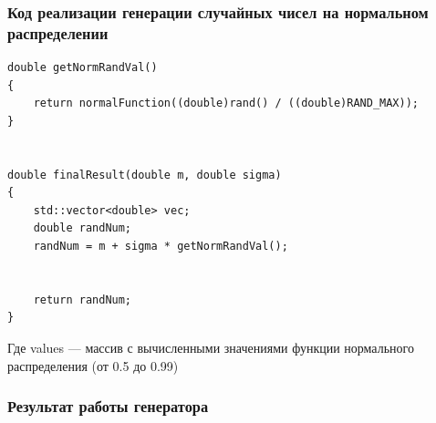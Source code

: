 \documentclass{beamer}
\begin{document}
\begin{frame}[fragile]
\frametitle{Код реализации генерации случайных чисел на нормальном распределении}
\scriptsize
\begin{verbatim}
double getNormRandVal()
{
    return normalFunction((double)rand() / ((double)RAND_MAX));
}


double finalResult(double m, double sigma)
{
    std::vector<double> vec;
    double randNum;
    randNum = m + sigma * getNormRandVal();


    return randNum;
}
\end{verbatim}
Где values --- массив с вычисленными значениями функции нормального распределения (от 0.5 до 0.99)
\end{frame}


\begin{frame}
\frametitle{Результат работы генератора}
\begin{columns}[T]
\begin{column}{0.35\textwidth}

\end{column}
\end{columns}
\end{frame}
\end{document}
